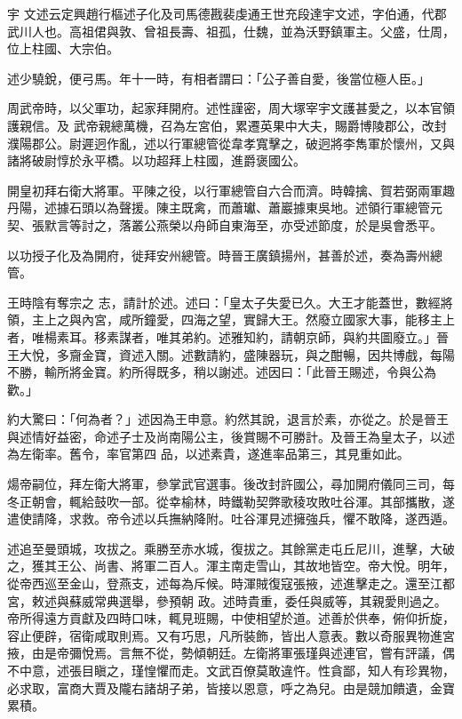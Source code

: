 
\begin{pinyinscope}

 宇
 文述云定興趙行樞述子化及司馬德戡裴虔通王世充段達宇文述，字伯通，代郡武川人也。高祖侰與敦、曾祖長壽、祖孤，仕魏，並為沃野鎮軍主。父盛，仕周，位上柱國、大宗伯。



 述少驍銳，便弓馬。年十一時，有相者謂曰：「公子善自愛，後當位極人臣。」



 周武帝時，以父軍功，起家拜開府。述性謹密，周大塚宰宇文護甚愛之，以本官領護親信。及
 武帝親總萬機，召為左宮伯，累遷英果中大夫，賜爵博陵郡公，改封濮陽郡公。尉遲迥作亂，述以行軍總管從韋孝寬擊之，破迥將李雋軍於懷州，又與諸將破尉惇於永平橋。以功超拜上柱國，進爵褒國公。



 開皇初拜右衛大將軍。平陳之役，以行軍總管自六合而濟。時韓擒、賀若弼兩軍趣丹陽，述據石頭以為聲援。陳主既禽，而蕭瓛、蕭巖據東吳地。述領行軍總管元契、張默言等討之，落叢公燕榮以舟師自東海至，亦受述節度，於是吳會悉平。



 以功授子化及為開府，徙拜安州總管。時晉王廣鎮揚州，甚善於述，奏為壽州總管。



 王時陰有奪宗之
 志，請計於述。述曰：「皇太子失愛已久。大王才能蓋世，數經將領，主上之與內宮，咸所鐘愛，四海之望，實歸大王。然廢立國家大事，能移主上者，唯楊素耳。移素謀者，唯其弟約。述雅知約，請朝京師，與約共圖廢立。」晉王大悅，多齎金寶，資述入關。述數請約，盛陳器玩，與之酣暢，因共博戲，每陽不勝，輸所將金寶。約所得既多，稍以謝述。述因曰：「此晉王賜述，令與公為歡。」



 約大驚曰：「何為者？」述因為王申意。約然其說，退言於素，亦從之。於是晉王與述情好益密，命述子士及尚南陽公主，後賞賜不可勝計。及晉王為皇太子，以述為左衛率。舊令，率官第四
 品，以述素貴，遂進率品第三，其見重如此。



 煬帝嗣位，拜左衛大將軍，參掌武官選事。後改封許國公，尋加開府儀同三司，每冬正朝會，輒給鼓吹一部。從幸榆林，時鐵勒契弊歌稜攻敗吐谷渾。其部攜散，遂遣使請降，求救。帝令述以兵撫納降附。吐谷渾見述擁強兵，懼不敢降，遂西遁。



 述追至曼頭城，攻拔之。乘勝至赤水城，復拔之。其餘黨走屯丘尼川，進擊，大破之，獲其王公、尚書、將軍二百人。渾主南走雪山，其故地皆空。帝大悅。明年，從帝西巡至金山，登燕支，述每為斥候。時渾賊復寇張掖，述進擊走之。還至江都宮，敕述與蘇威常典選舉，參預朝
 政。述時貴重，委任與威等，其親愛則過之。帝所得遠方貢獻及四時口味，輒見班賜，中使相望於道。述善於供奉，俯仰折旋，容止便辟，宿衛咸取則焉。又有巧思，凡所裝飾，皆出人意表。數以奇服異物進宮掖，由是帝彌悅焉。言無不從，勢傾朝廷。左衛將軍張瑾與述連官，嘗有評議，偶不中意，述張目瞋之，瑾惶懼而走。文武百僚莫敢違忤。性貪鄙，知人有珍異物，必求取，富商大賈及隴右諸胡子弟，皆接以恩意，呼之為兒。由是競加饋遺，金寶累積。




\end{pinyinscope}
